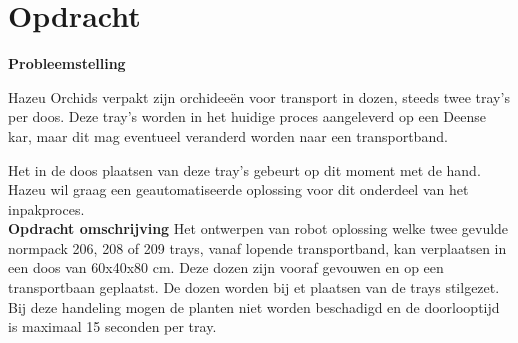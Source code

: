 
\section{Opdracht}
\textbf{Probleemstelling}

Hazeu Orchids verpakt zijn orchideeën voor transport in dozen, steeds twee tray's per doos. Deze tray's worden in het huidige proces aangeleverd op een Deense kar, maar dit mag eventueel veranderd worden naar een transportband.\newline

Het in de doos plaatsen van deze tray's gebeurt op dit moment met de hand. Hazeu wil graag een geautomatiseerde oplossing voor dit onderdeel van het inpakproces.\\[0.5cm]


\textbf{Opdracht omschrijving}
Het ontwerpen van robot oplossing welke twee gevulde normpack  206, 208 of 209 trays, vanaf lopende transportband, kan verplaatsen in een doos van 60x40x80 cm. Deze dozen zijn vooraf gevouwen en op een transportbaan geplaatst. De dozen worden bij et plaatsen van de trays stilgezet. Bij deze handeling mogen de planten niet worden beschadigd en de doorlooptijd is maximaal 15 seconden per tray.

\newpage
